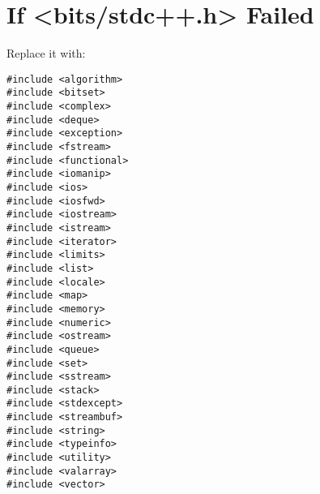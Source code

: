 \section{If <bits/stdc++.h> Failed}
Replace it with:
\begin{lstlisting}
#include <algorithm>
#include <bitset>
#include <complex>
#include <deque>
#include <exception>
#include <fstream>
#include <functional>
#include <iomanip>
#include <ios>
#include <iosfwd>
#include <iostream>
#include <istream>
#include <iterator>
#include <limits>
#include <list>
#include <locale>
#include <map>
#include <memory>
#include <numeric>
#include <ostream>
#include <queue>
#include <set>
#include <sstream>
#include <stack>
#include <stdexcept>
#include <streambuf>
#include <string>
#include <typeinfo>
#include <utility>
#include <valarray>
#include <vector>
\end{lstlisting}